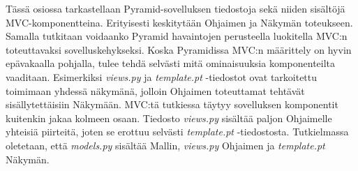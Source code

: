 \documentclass[utf8]{gradu3}
\begin{document}
Tässä osiossa tarkastellaan Pyramid-sovelluksen tiedostoja sekä niiden sisältöjä MVC-komponentteina. Erityisesti keskitytään Ohjaimen ja Näkymän toteukseen. Samalla tutkitaan voidaanko Pyramid havaintojen perusteella luokitella MVC:n toteuttavaksi sovelluskehykseksi.
Koska Pyramidissa MVC:n määrittely on hyvin epävakaalla pohjalla, tulee tehdä selvästi mitä ominaisuuksia komponenteilta vaaditaan. Esimerkiksi \emph{views.py} ja \emph{template.pt} -tiedostot ovat tarkoitettu toimimaan yhdessä näkymänä, jolloin Ohjaimen toteuttamat tehtävät sisällytettäisiin Näkymään. MVC:tä tutkiessa täytyy sovelluksen komponentit kuitenkin jakaa kolmeen osaan.  Tiedosto \emph{views.py}
sisältää paljon Ohjaimelle yhteisiä piirteitä, joten se erottuu selvästi \emph{template.pt} -tiedostosta. Tutkielmassa oletetaan, että \emph{models.py} sisältää Mallin, \emph{views.py} Ohjaimen ja \emph{template.pt} Näkymän.
\end{document}
